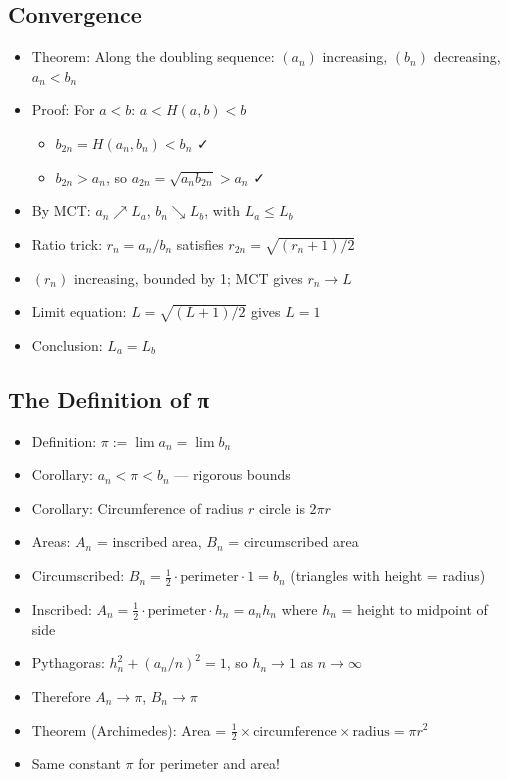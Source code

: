 \documentclass[
  10pt,
  letterpaper,
]{scrbook}
\providecommand{\tightlist}{%
  \setlength{\itemsep}{0pt}\setlength{\parskip}{0pt}}
\begin{document}
\subsection{Convergence}\label{convergence-1}

\begin{itemize}
\tightlist
\item
  Theorem: Along the doubling sequence: \((a_n)\) increasing, \((b_n)\)
  decreasing, \(a_n < b_n\)
\item
  Proof: For \(a < b\): \(a < H(a,b) < b\)

  \begin{itemize}
  \tightlist
  \item
    \(b_{2n} = H(a_n, b_n) < b_n\) ✓
  \item
    \(b_{2n} > a_n\), so \(a_{2n} = \sqrt{a_n b_{2n}} > a_n\) ✓
  \end{itemize}
\item
  By MCT: \(a_n \nearrow L_a\), \(b_n \searrow L_b\), with
  \(L_a \leq L_b\)
\item
  Ratio trick: \(r_n = a_n/b_n\) satisfies
  \(r_{2n} = \sqrt{(r_n + 1)/2}\)
\item
  \((r_n)\) increasing, bounded by 1; MCT gives \(r_n \to L\)
\item
  Limit equation: \(L = \sqrt{(L+1)/2}\) gives \(L = 1\)
\item
  Conclusion: \(L_a = L_b\)
\end{itemize}

\subsection{The Definition of π}\label{the-definition-of-ux3c0}

\begin{itemize}
\tightlist
\item
  Definition: \(\pi := \lim a_n = \lim b_n\)
\item
  Corollary: \(a_n < \pi < b_n\) --- rigorous bounds
\item
  Corollary: Circumference of radius \(r\) circle is \(2\pi r\)
\item
  Areas: \(A_n\) = inscribed area, \(B_n\) = circumscribed area
\item
  Circumscribed:
  \(B_n = \frac{1}{2} \cdot \text{perimeter} \cdot 1 = b_n\) (triangles
  with height = radius)
\item
  Inscribed:
  \(A_n = \frac{1}{2} \cdot \text{perimeter} \cdot h_n = a_n h_n\) where
  \(h_n\) = height to midpoint of side
\item
  Pythagoras: \(h_n^2 + (a_n/n)^2 = 1\), so \(h_n \to 1\) as
  \(n \to \infty\)
\item
  Therefore \(A_n \to \pi\), \(B_n \to \pi\)
\item
  Theorem (Archimedes): Area =
  \(\frac{1}{2} \times \text{circumference} \times \text{radius} = \pi r^2\)
\item
  Same constant \(\pi\) for perimeter and area!
\end{itemize}
\end{document}
